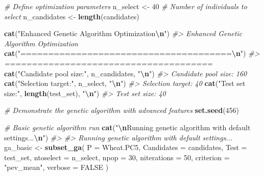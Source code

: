 \documentclass[
]{article}
\newenvironment{Shaded}{\begin{snugshade}}{\end{snugshade}}
\newcommand{\AttributeTok}[1]{\textcolor[rgb]{0.13,0.29,0.53}{#1}}
\newcommand{\CommentTok}[1]{\textcolor[rgb]{0.56,0.35,0.01}{\textit{#1}}}
\newcommand{\ConstantTok}[1]{\textcolor[rgb]{0.56,0.35,0.01}{#1}}
\newcommand{\DecValTok}[1]{\textcolor[rgb]{0.00,0.00,0.81}{#1}}
\newcommand{\FunctionTok}[1]{\textcolor[rgb]{0.13,0.29,0.53}{\textbf{#1}}}
\newcommand{\NormalTok}[1]{#1}
\newcommand{\OtherTok}[1]{\textcolor[rgb]{0.56,0.35,0.01}{#1}}
\newcommand{\SpecialCharTok}[1]{\textcolor[rgb]{0.81,0.36,0.00}{\textbf{#1}}}
\newcommand{\StringTok}[1]{\textcolor[rgb]{0.31,0.60,0.02}{#1}}
\begin{document}
\begin{Shaded}
\begin{Highlighting}[]
\CommentTok{\# Define optimization parameters}
\NormalTok{n\_select }\OtherTok{\textless{}{-}} \DecValTok{40}  \CommentTok{\# Number of individuals to select}
\NormalTok{n\_candidates }\OtherTok{\textless{}{-}} \FunctionTok{length}\NormalTok{(candidates)}

\FunctionTok{cat}\NormalTok{(}\StringTok{"Enhanced Genetic Algorithm Optimization}\SpecialCharTok{\textbackslash{}n}\StringTok{"}\NormalTok{)}
\CommentTok{\#\textgreater{} Enhanced Genetic Algorithm Optimization}
\FunctionTok{cat}\NormalTok{(}\StringTok{"======================================}\SpecialCharTok{\textbackslash{}n}\StringTok{"}\NormalTok{)}
\CommentTok{\#\textgreater{} ======================================}
\FunctionTok{cat}\NormalTok{(}\StringTok{"Candidate pool size:"}\NormalTok{, n\_candidates, }\StringTok{"}\SpecialCharTok{\textbackslash{}n}\StringTok{"}\NormalTok{)}
\CommentTok{\#\textgreater{} Candidate pool size: 160}
\FunctionTok{cat}\NormalTok{(}\StringTok{"Selection target:"}\NormalTok{, n\_select, }\StringTok{"}\SpecialCharTok{\textbackslash{}n}\StringTok{"}\NormalTok{)}
\CommentTok{\#\textgreater{} Selection target: 40}
\FunctionTok{cat}\NormalTok{(}\StringTok{"Test set size:"}\NormalTok{, }\FunctionTok{length}\NormalTok{(test\_set), }\StringTok{"}\SpecialCharTok{\textbackslash{}n}\StringTok{"}\NormalTok{)}
\CommentTok{\#\textgreater{} Test set size: 40}

\CommentTok{\# Demonstrate the genetic algorithm with advanced features}
\FunctionTok{set.seed}\NormalTok{(}\DecValTok{456}\NormalTok{)}

\CommentTok{\# Basic genetic algorithm run}
\FunctionTok{cat}\NormalTok{(}\StringTok{"}\SpecialCharTok{\textbackslash{}n}\StringTok{Running genetic algorithm with default settings...}\SpecialCharTok{\textbackslash{}n}\StringTok{"}\NormalTok{)}
\CommentTok{\#\textgreater{} }
\CommentTok{\#\textgreater{} Running genetic algorithm with default settings...}
\NormalTok{ga\_basic }\OtherTok{\textless{}{-}} \FunctionTok{subset\_ga}\NormalTok{(}
  \AttributeTok{P =}\NormalTok{ Wheat.PC5,}
  \AttributeTok{Candidates =}\NormalTok{ candidates,}
  \AttributeTok{Test =}\NormalTok{ test\_set,}
  \AttributeTok{ntoselect =}\NormalTok{ n\_select,}
  \AttributeTok{npop =} \DecValTok{30}\NormalTok{,}
  \AttributeTok{niterations =} \DecValTok{50}\NormalTok{,}
  \AttributeTok{criterion =} \StringTok{"pev\_mean"}\NormalTok{,}
  \AttributeTok{verbose =} \ConstantTok{FALSE}
\NormalTok{)}


\end{Highlighting}
\end{Shaded}
\end{document}
